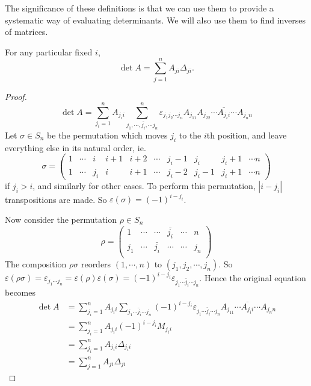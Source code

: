 \documentclass[a4paper]{article}
\begin{document}
The significance of these definitions is that we can use them to provide a systematic way of evaluating determinants. We will also use them to find inverses of matrices.
\begin{thm}
  For any particular fixed $i$,
  \[
    \det A = \sum_{j = 1}^{n} A_{ji}\Delta_{ji}.
  \]
\end{thm}
\begin{proof}
  \[
    \det A = \sum_{j_i = 1}^nA_{j_ii} \sum_{j_1, \cdots, \overline{j_i}, \cdots j_n}^n \varepsilon_{j_1j_2\cdots j_n} A_{j_11}A_{j_22}\cdots \overline{A_{j_ii}}\cdots A_{j_nn}
  \]
  Let $\sigma \in S_n$ be the permutation which moves $j_i$ to the $i$th position, and leave everything else in its natural order, ie.
  \[
    \sigma =
    \begin{pmatrix}
      1 &\cdots& i & i + 1 & i + 2 & \cdots &j_i - 1&j_i& j_i + 1 & \cdots n\\
      1 & \cdots & j_i & i & i + 1 & \cdots & j_i - 2 & j_i - 1 & j_i + 1 & \cdots n
    \end{pmatrix}
  \]
  if $j_i > i$, and similarly for other cases. To perform this permutation, $|i - j_i|$ transpositions are made. So $\varepsilon(\sigma) = (-1)^{i - j_i}$.

  Now consider the permutation $\rho\in S_n$
  \[
    \rho =
    \begin{pmatrix}
      1 & \cdots & \cdots & \bar {j_i} & \cdots & n\\
      j_1 & \cdots & \bar{j_i} & \cdots & \cdots & j_n\\
    \end{pmatrix}
  \]
  The composition $\rho\sigma$ reorders $(1, \cdots, n)$ to $(j_1, j_2,\cdots, j_n)$. So $\varepsilon(\rho\sigma) = \varepsilon_{j_1\cdots j_n} = \varepsilon(\rho)\varepsilon(\sigma) = (-1)^{i - j_i} \varepsilon_{j_1\cdots \bar j_i \cdots j_n}$. Hence the original equation becomes
  \begin{align*}
    \det A &= \sum_{j_i = 1}^n A_{j_i i} \sum_{j_1\cdots \bar j_i\cdots j_n}(-1)^{i - j_i} \varepsilon_{j_1\cdots \bar j_i \cdots j_n} A_{j_11}\cdots \overline{A_{j_ii}} \cdots A_{j_nn}\\
    &= \sum_{j_i = 1}^n A_{j_ii} (-1)^{i - j_i}M_{j_ii}\\
    &= \sum_{j_i = 1}^{n} A_{j_ii}\Delta_{j_ii}\\
    &= \sum_{j = 1}^{n} A_{ji}\Delta_{ji}
  \end{align*}
\end{proof}
\end{document}
